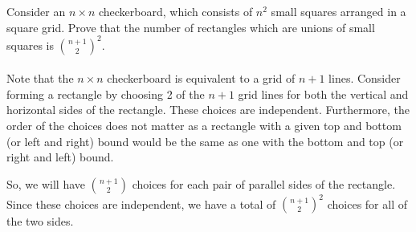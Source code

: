 \documentclass[../hw1]{subfiles}
\begin{document}
Consider an $n \times n$ checkerboard, which consists of $n^2$ small squares arranged in a square grid. Prove that the number of rectangles which are unions of small squares is $\binom{n+1}{2}^2$.
\\\\
Note that the $n\times n$ checkerboard is equivalent to a grid of $n+1$ lines.
Consider forming a rectangle by choosing 2 of the $n+1$ grid lines for both the vertical and horizontal sides of the rectangle.
These choices are independent.
Furthermore, the order of the choices does not matter as a rectangle with a given top and bottom (or left and right) bound would be the same as one with the bottom and top (or right and left) bound.

So, we will have $\binom{n+1}{2}$ choices for each pair of parallel sides of the rectangle.
Since these choices are independent, we have a total of ${\binom{n+1}{2}}^2$ choices for all of the two sides.
\\
\end{document}
